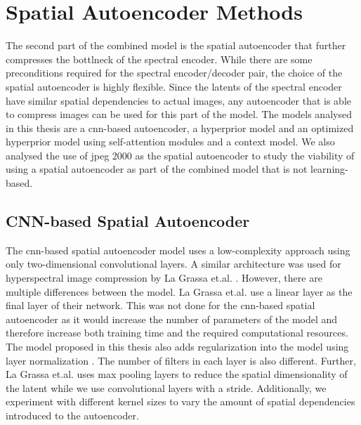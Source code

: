 \section{Spatial Autoencoder Methods\label{sec:spatialae}}
The second part of the combined model is the spatial autoencoder that further compresses the bottlneck of the spectral encoder. While there are some preconditions required for the spectral encoder/decoder pair, the choice of the spatial autoencoder is highly flexible. Since the latents of the spectral encoder have similar spatial dependencies to actual images, any autoencoder that is able to compress images can be used for this part of the model. The models analysed in this thesis are a \ac{cnn}-based autoencoder, a hyperprior model and an optimized hyperprior model using self-attention modules and a context model. We also analysed the use of \ac{jpeg} 2000 as the spatial autoencoder to study the viability of using a spatial autoencoder as part of the combined model that is not learning-based.
\subsection{CNN-based Spatial Autoencoder\label{sec:conv2d}}
The \ac{cnn}-based spatial autoencoder model uses a low-complexity approach using only two-dimensional convolutional layers. A similar architecture was used for hyperspectral image compression by La Grassa et.al. \citep{la_grassa_hyperspectral_2022}. However, there are multiple differences between the model. La Grassa et.al. use a linear layer as the final layer of their network. This was not done for the \ac{cnn}-based spatial autoencoder as it would increase the number of parameters of the model and therefore increase both training time and the required computational resources. The model proposed in this thesis also adds regularization into the model using layer normalization \citep{ba_layer_2016}. The number of filters in each layer is also different. Further, La Grassa et.al. uses max pooling layers to reduce the spatial dimensionality of the latent while we use convolutional layers with a stride. Additionally, we experiment with different kernel sizes to vary the amount of spatial dependencies introduced to the autoencoder.

